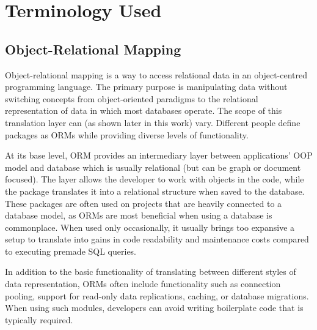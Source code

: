\chapter{Terminology Used}
\section{Object-Relational Mapping}

Object-relational mapping is a way to access relational data in an object-centred programming language. The primary purpose is manipulating data without switching concepts from object-oriented paradigms to the relational representation of data in which most databases operate. The scope of this translation layer can (as shown later in this work) vary. Different people define packages as ORMs while providing diverse levels of functionality. \par
At its base level, ORM provides an intermediary layer between applications' OOP model and database which is usually relational (but can be graph or document focused). The layer allows the developer to work with objects in the code, while the package translates it into a relational structure when saved to the database. These packages are often used on projects that are heavily connected to a database model, as ORMs are most beneficial when using a database is commonplace. When used only occasionally, it usually brings too expansive a setup to translate into gains in code readability and maintenance costs compared to executing premade SQL queries. \par
In addition to the basic functionality of translating between different styles of data representation, ORMs often include functionality such as connection pooling, support for read-only data replications, caching, or database migrations. When using such modules, developers can avoid writing boilerplate code that is typically required. \par


